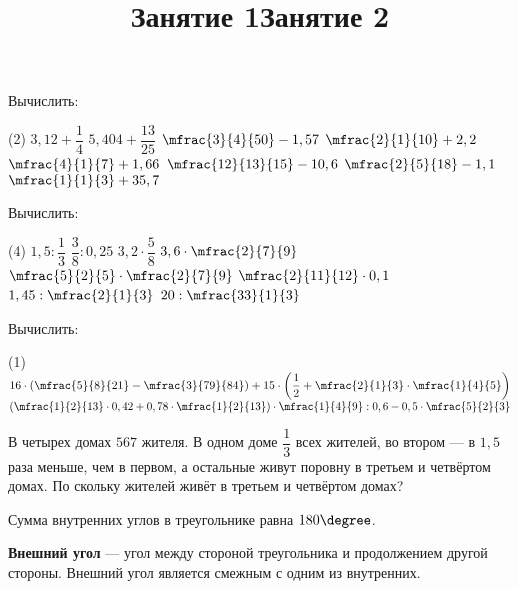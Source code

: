 %
%

\begin{class}[number=1-2]
	\title{Занятие 1}
	\begin{listofex}
		\item Вычислить:
		\begin{tasks}(2)
			\task \( 3,12+\dfrac{1}{4} \)
			\task \( 5,404+\dfrac{13}{25} \)
			\task \( \mfrac{3}{4}{50}-1,57\)
			\task \( \mfrac{2}{1}{10}+2,2 \)
			\task \( \mfrac{4}{1}{7}+1,66 \)
			\task \( \mfrac{12}{13}{15}-10,6 \)
			\task \( \mfrac{2}{5}{18}-1,1\)
			\task \( \mfrac{1}{1}{3}+35,7 \)
		\end{tasks}
		\item Вычислить:
		\begin{tasks}(4)
			\task \( 1,5 : \dfrac{1}{3} \)
			\task \( \dfrac{3}{8} : 0,25 \)
			\task \( 3,2 \cdot \dfrac{5}{8} \)
			\task \( 3,6 \cdot \mfrac{2}{7}{9} \)
			\task \( \mfrac{5}{2}{5} \cdot  \mfrac{2}{7}{9} \)
			\task \( \mfrac{2}{11}{12} \cdot 0,1 \)
			\task \( 1,45 : \mfrac{2}{1}{3} \)
			\task \( 20 : \mfrac{33}{1}{3} \)
		\end{tasks}
		\item Вычислить:
		\begin{tasks}(1)
			\task \( 16 \cdot \left( \mfrac{5}{8}{21} - \mfrac{3}{79}{84} \right) + 15 \cdot \left( \dfrac{1}{2} + \mfrac{2}{1}{3} \cdot \mfrac{1}{4}{5} \right) \)
			\task \( \left( \mfrac{1}{2}{13} \cdot 0,42 + 0,78 \cdot \mfrac{1}{2}{13} \right) \cdot \mfrac{1}{4}{9} : 0,6 - 0,5 \cdot \mfrac{5}{2}{3} \)
		\end{tasks}
		\item В четырех домах \(567\) жителя. В одном доме \(\dfrac{1}{3}\) всех жителей, во втором --- в \(1,5\) раза меньше, чем в первом, а остальные живут поровну в третьем и четвёртом домах. По скольку жителей живёт в третьем и четвёртом домах?
	\newpage
	\title{Занятие 2}
	\end{listofex}
	\begin{definit}
		Сумма внутренних углов в треугольнике равна \( 180\degree \).
	\end{definit}
	\begin{definit}
		\textbf{Внешний угол} --- угол между стороной треугольника и продолжением другой стороны. Внешний угол является смежным с одним из внутренних.
	\end{definit}

\end{class}
